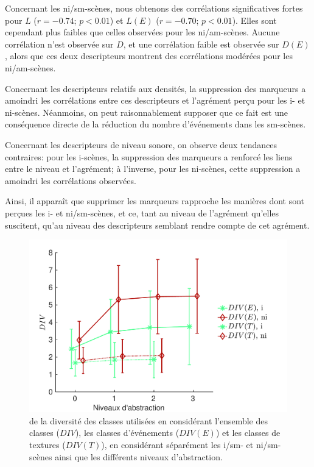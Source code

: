 Concernant les ni/sm-scènes, nous obtenons des corrélations significatives fortes pour $L$ ($r=-0.74$; $p<0.01$) et  $L(E)$ ($r=-0.70$; $p<0.01$). Elles sont cependant plus faibles que celles observées pour les ni/am-scènes. Aucune corrélation n'est observée sur $D$, et une corrélation faible est observée sur $D(E)$, alors que ces deux descripteurs montrent des corrélations modérées pour les ni/am-scènes.
 
Concernant les descripteurs relatifs aux densités, la suppression des marqueurs a amoindri les corrélations entre ces descripteurs et l'agrément perçu pour les i- et ni-scènes. Néanmoins, on peut raisonnablement supposer que ce fait est une conséquence directe de la réduction du nombre d'événements dans les sm-scènes.

Concernant les descripteurs de niveau sonore, on observe deux tendances contraires: pour les i-scènes, la suppression des marqueurs a renforcé les liens entre le niveau et l'agrément; à l'inverse, pour les ni-scènes, cette suppression a amoindri les corrélations observées.

Ainsi, il apparaît que supprimer les marqueurs rapproche les manières dont sont perçues les i- et ni/sm-scènes, et ce, tant au niveau de l'agrément qu'elles suscitent, qu'au niveau des descripteurs semblant rendre compte de cet agrément.

\begin{figure}[t]
        \myfloatalign
        \includegraphics[width=.8\linewidth]{gfx/ch_5/xp4_div_1}
        \caption{  de la diversité des classes utilisées en considérant l'ensemble des classes ($DIV$), les classes d'événements ($DIV(E)$) et les classes de textures ($DIV(T)$), en considérant séparément les i/sm- et ni/sm-scènes ainsi que les différents niveaux d'abstraction.}\label{fig:diversitySansMarker}
\end{figure}

